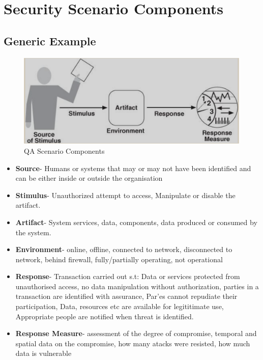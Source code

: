 \documentclass[a4paper]{report}
\begin{document}
\section{Security Scenario Components}
\subsection{Generic Example}
\begin{figure}[h]
\centering 
\includegraphics[scale=0.3]{aimages/genreralqascenario.png}
\caption{\label{tab:widgets} QA Scenario Components}
\end{figure}

\begin{itemize}
\item \textbf{Source}- Humans or systems that may or may not have been identified and can be either inside or outside the organisation
\item \textbf{Stimulus}- Unauthorized attempt to access, Manipulate or disable the artifact.
\item \textbf{Artifact}- System services, data, components, data produced or consumed by the system.
\item \textbf{Environment}- online, offline, connected to network, disconnected to network, behind firewall, fully/partially operating, not operational
\item \textbf{Response}- Transaction carried out s.t: Data or services protected from unauthorised access, no data manipulation without authorization, parties in a transaction are identified with assurance, Par'es cannot repudiate their participation, Data, resources etc are available for legititimate use, Appropriate people are notified when threat is identified.
\item \textbf{Response Measure}- assessment of the degree of compromise, temporal and spatial data on the compromise, how many atacks were resisted, how much data is vulnerable
\end{itemize}
\end{document}
